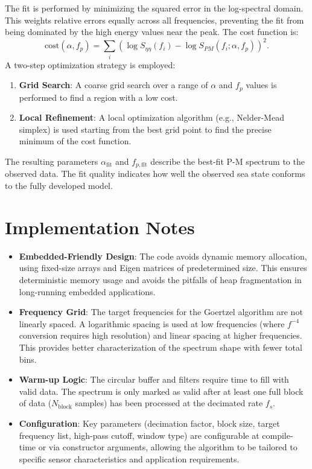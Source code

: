 \documentclass[11pt]{article}
\begin{document}
The fit is performed by minimizing the squared error in the log-spectral domain. This weights relative errors equally across all frequencies, preventing the fit from being dominated by the high energy values near the peak. The cost function is:
\begin{equation}
\text{cost}(\alpha, f_p) = \sum_{i} \left(\log S_{\eta\eta}(f_i) - \log S_{PM}(f_i;\alpha, f_p)\right)^2.
\end{equation}
A two-step optimization strategy is employed:
\begin{enumerate}
    \item \textbf{Grid Search}: A coarse grid search over a range of $\alpha$ and $f_p$ values is performed to find a region with a low cost.
    \item \textbf{Local Refinement}: A local optimization algorithm (e.g., Nelder-Mead simplex) is used starting from the best grid point to find the precise minimum of the cost function.
\end{enumerate}
The resulting parameters $\alpha_{\text{fit}}$ and $f_{p,\text{fit}}$ describe the best-fit P-M spectrum to the observed data. The fit quality indicates how well the observed sea state conforms to the fully developed model.

\section{Implementation Notes}
\label{sec:implementation}
\begin{itemize}
\item \textbf{Embedded-Friendly Design}: The code avoids dynamic memory allocation, using fixed-size arrays and Eigen matrices of predetermined size. This ensures deterministic memory usage and avoids the pitfalls of heap fragmentation in long-running embedded applications.
\item \textbf{Frequency Grid}: The target frequencies for the Goertzel algorithm are not linearly spaced. A logarithmic spacing is used at low frequencies (where $f^{-4}$ conversion requires high resolution) and linear spacing at higher frequencies. This provides better characterization of the spectrum shape with fewer total bins.
\item \textbf{Warm-up Logic}: The circular buffer and filters require time to fill with valid data. The spectrum is only marked as valid after at least one full block of data ($N_\text{block}$ samples) has been processed at the decimated rate $f_s$.
\item \textbf{Configuration}: Key parameters (decimation factor, block size, target frequency list, high-pass cutoff, window type) are configurable at compile-time or via constructor arguments, allowing the algorithm to be tailored to specific sensor characteristics and application requirements.
\end{itemize}
\end{document}
